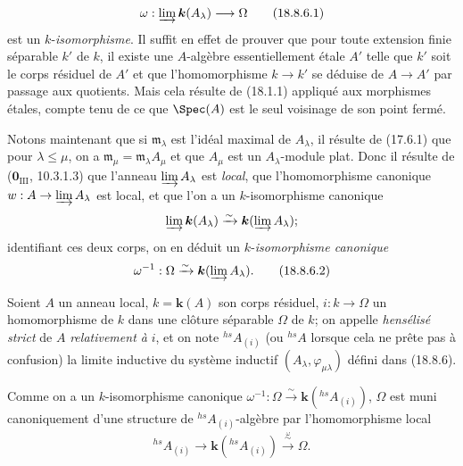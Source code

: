 \begin{env}[18.8.6]
\begin{equation}
  \omega:\varinjlim\boldsymbol{k}(A_\lambda)\longrightarrow\Omega
  \label{IV.18.8.6.1}
  \tag{18.8.6.1}
\end{equation}
est un $k$-\emph{isomorphisme}. Il suffit en effet de prouver que pour toute extension finie séparable $k'$ de $k$, il existe une $A$-algèbre essentiellement étale $A'$ telle que $k'$ soit le corps résiduel de $A'$ et que l'homomorphisme $k\to k'$ se déduise de $A\to A'$ par passage aux quotients. Mais cela résulte de (18.1.1) appliqué aux morphismes étales, compte tenu de ce que $\Spec(A)$ est le seul voisinage de son point fermé.

Notons maintenant que si $\mathfrak m_\lambda$ est l'idéal maximal de $A_\lambda$, il résulte de (17.6.1) que pour $\lambda\leq\mu$, on a $\mathfrak m_\mu=\mathfrak m_\lambda A_\mu$ et que $A_\mu$ est un $A_\lambda$-module plat. Donc il résulte de ($\mathbf{0}_{\mathrm{III}}$, 10.3.1.3) que l'anneau $\varinjlim A_\lambda$ est \emph{local}, que l'homomorphisme canonique $w:A\to\varinjlim A_\lambda$ est local, et que l'on a un $k$-isomorphisme canonique
\[
  \varinjlim\boldsymbol{k}(A_\lambda)\xrightarrow{\sim}\boldsymbol{k}(\varinjlim A_\lambda);
\]
identifiant ces deux corps, on en déduit un $k$-\emph{isomorphisme canonique}
\begin{equation}
  \omega^{-1}:\Omega\xrightarrow{\sim}\boldsymbol{k}(\varinjlim A_\lambda).
  \label{IV.18.8.6.2}
  \tag{18.8.6.2}
\end{equation}
\end{env}

\begin{definition}[18.8.7]
Soient $A$ un anneau local, $k=\boldsymbol{k}(A)$ son corps résiduel, $i:k\to\Omega$ un homomorphisme de $k$ dans une clôture séparable $\Omega$ de $k$; on appelle \emph{hensélisé strict} de $A$ \emph{relativement à} $i$, et on note ${}^{hs}\!A_{(i)}$ (ou ${}^{hs}\!A$ lorsque cela ne prête pas à confusion) la limite inductive du système inductif $(A_\lambda,\varphi_{\mu\lambda})$ défini dans \textup{(18.8.6)}.
\end{definition}

Comme on a un $k$-isomorphisme canonique $\omega^{-1}:\Omega\xrightarrow{\sim}\boldsymbol{k}({}^{hs}\!A_{(i)})$, $\Omega$ est muni canoniquement d'une structure de ${}^{hs}\!A_{(i)}$-algèbre par l'homomorphisme local
\[
  {}^{hs}\!A_{(i)}\longrightarrow\boldsymbol{k}({}^{hs}\!A_{(i)})\xrightarrow{\overset{\omega}{\sim}}\Omega.
\]

